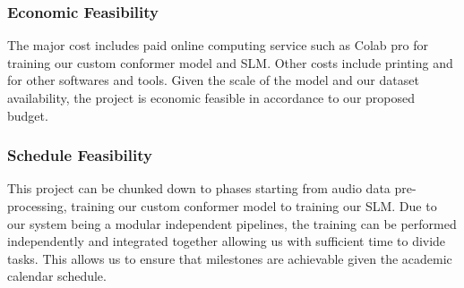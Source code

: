 \subsubsection{Economic Feasibility}
The major cost includes paid online computing service such as Colab pro for training our custom conformer model and SLM. Other costs include printing and for other softwares and tools. Given the scale of the model and our dataset availability, the project is economic feasible in accordance to our proposed budget.

\subsubsection{Schedule Feasibility}
This project can be chunked down to phases starting from audio data pre-processing, training our custom conformer model to training our SLM. Due to our system being a modular independent pipelines, the training can be performed independently and integrated together allowing us with sufficient time to divide tasks. This allows us to ensure that milestones are achievable given the academic calendar schedule.